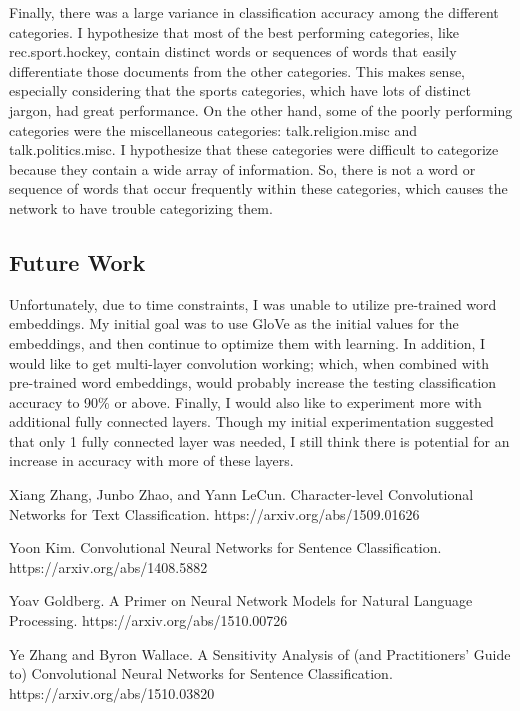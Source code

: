 \documentclass{article}
\begin{document}
Finally, there was a large variance in classification accuracy among the different categories. I hypothesize that most of the best performing
categories, like rec.sport.hockey, contain distinct words or sequences of words that easily differentiate those documents from the other
categories. This makes sense, especially considering that the sports categories, which have lots of distinct jargon, had great performance.
On the other hand, some of the poorly performing categories were the miscellaneous categories: talk.religion.misc and talk.politics.misc. I
hypothesize that these categories were difficult to categorize because they contain a wide array of information. So, there is not a word or
sequence of words that occur frequently within these categories, which causes the network to have trouble categorizing them.

\subsection{Future Work}
Unfortunately, due to time constraints, I was unable to utilize pre-trained word embeddings. My initial goal was to use GloVe as
the initial values for the embeddings, and then continue to optimize them with learning. In addition, I would like to get
multi-layer convolution working; which, when combined with pre-trained word embeddings, would probably increase the testing classification accuracy
to 90\% or above. Finally, I would also like to experiment more with additional fully connected layers. Though my initial experimentation
suggested that only 1 fully connected layer was needed, I still think there is potential for an increase in accuracy with more of these layers.

\newpage

\begin{thebibliography}{9}

Xiang Zhang, Junbo Zhao, and Yann LeCun.  Character-level Convolutional Networks for Text Classification.
https://arxiv.org/abs/1509.01626

Yoon Kim.  Convolutional Neural Networks for Sentence Classification.
https://arxiv.org/abs/1408.5882

Yoav Goldberg. A Primer on Neural Network Models for Natural Language Processing.
https://arxiv.org/abs/1510.00726

Ye Zhang and Byron Wallace. A Sensitivity Analysis of (and Practitioners' Guide to) Convolutional Neural Networks for Sentence Classification.
https://arxiv.org/abs/1510.03820

\end{thebibliography}
\end{document}
